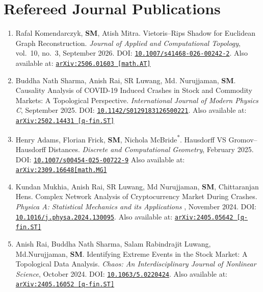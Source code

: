 \documentclass[11pt]{article}
\begin{document}
\section{Refereed Journal Publications}
\begin{enumerate}
\item[11.] Rafal Komendarczyk, \textbf{SM}, Atish Mitra. Vietoris--Rips Shadow for Euclidean Graph Reconstruction. \emph{Journal of Applied and Computational Topology}, vol.~10, no.~3, September 2026.
DOI: \href{https://doi.org/10.1007/s41468-026-00242-2}{\tt 10.1007/s41468-026-00242-2}.
Also available at:
\href{https://arxiv.org/abs/2506.01603}{\tt arXiv:2506.01603 [math.AT]}

\item[10.] Buddha Nath Sharma, Anish Rai, SR Luwang, Md. Nurujjaman, \textbf{SM}. Causality Analysis of COVID-19 Induced Crashes in Stock and Commodity Markets: A Topological Perspective. \emph{International Journal of Modern Physics C}, September 2025.
DOI: \href{https://doi.org/10.1142/S0129183126500221}{\tt 10.1142/S0129183126500221}.
Also available at:
\href{https://doi.org/10.48550/arXiv.2502.14431}{\tt arXiv:2502.14431 [q-fin.ST]}

\item[9.] Henry Adams, Florian Frick, \textbf{SM}, Nichola McBride\textsuperscript{*}. Hausdorff VS Gromov--Hausdorff Distances.
\emph{Discrete and Computational Geometry}, February 2025.
DOI: \href{https://doi.org/10.1007/s00454-025-00722-9}{\tt 10.1007/s00454-025-00722-9}
Also available at:
\href{https://arxiv.org/abs/2309.16648}{\tt arXiv:2309.16648[math.MG]}

\item[8.] Kundan Mukhia, Anish Rai, SR Luwang, Md Nurujjaman, \textbf{SM}, Chittaranjan Hens. Complex Network Analysis of Cryptocurrency Market During Crashes. \emph{Physica A: Statistical Mechanics and its Applications}
, November 2024. 
DOI: \href{https://doi.org/10.1016/j.physa.2024.130095}{\tt 10.1016/j.physa.2024.130095}.
Also available at:
\href{https://arxiv.org/abs/2405.05642}{\tt arXiv:2405.05642 [q-fin.ST]}

\item[7.] Anish Rai, Buddha Nath Sharma, Salam Rabindrajit Luwang, Md.Nurujjaman, \textbf{SM}. Identifying Extreme Events in the Stock Market: A Topological Data Analysis. \emph{Chaos: An Interdisciplinary Journal of Nonlinear Science},
October 2024. 
DOI: \href{https://doi.org/10.1063/5.0220424}{\tt 10.1063/5.0220424}. 
Also available at:
\href{https://arxiv.org/abs/2405.16052}{\tt arXiv:2405.16052 [q-fin.ST]}\\



\end{enumerate}
\end{document}
